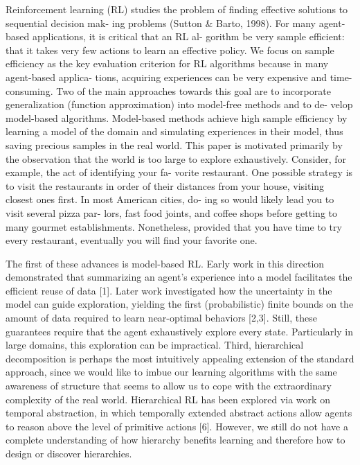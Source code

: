 Reinforcement learning (RL) studies the problem of
finding effective solutions to sequential decision mak-
ing problems (Sutton & Barto, 1998). For many
agent-based applications, it is critical that an RL al-
gorithm be very sample efficient: that it takes very
few actions to learn an effective policy. We focus on
sample efficiency as the key evaluation criterion for
RL algorithms because in many agent-based applica-
tions, acquiring experiences can be very expensive and
time-consuming. Two of the main approaches towards
this goal are to incorporate generalization (function
approximation) into model-free methods and to de-
velop model-based algorithms. Model-based methods
achieve high sample efficiency by learning a model of
the domain and simulating experiences in their model,
thus saving precious samples in the real world.
This paper is motivated primarily by the observation
that the world is too large to explore exhaustively.
Consider, for example, the act of identifying your fa-
vorite restaurant. One possible strategy is to visit the
restaurants in order of their distances from your house,
visiting closest ones first. In most American cities, do-
ing so would likely lead you to visit several pizza par-
lors, fast food joints, and coffee shops before getting to
many gourmet establishments. Nonetheless, provided
that you have time to try every restaurant, eventually
you will find your favorite one.

The first of these advances is model-based RL. Early work in this direction
demonstrated that summarizing an agent’s experience into a model facilitates
the efficient reuse of data [1]. Later work investigated how the uncertainty in
the model can guide exploration, yielding the first (probabilistic) finite bounds
on the amount of data required to learn near-optimal behaviors [2,3]. Still, these
guarantees require that the agent exhaustively explore every state. Particularly
in large domains, this exploration can be impractical.
Third, hierarchical decomposition is perhaps the most intuitively appealing
extension of the standard approach, since we would like to imbue our learning
algorithms with the same awareness of structure that seems to allow us to
cope with the extraordinary complexity of the real world. Hierarchical RL has
been explored via work on temporal abstraction, in which temporally extended
abstract actions allow agents to reason above the level of primitive actions [6].
However, we still do not have a complete understanding of how hierarchy benefits
learning and therefore how to design or discover hierarchies.

